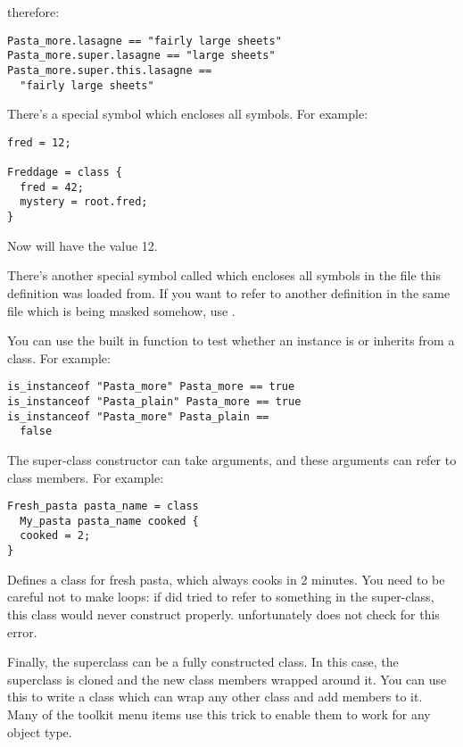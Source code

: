 \noindent
therefore:

\begin{verbatim}
Pasta_more.lasagne == "fairly large sheets"
Pasta_more.super.lasagne == "large sheets"
Pasta_more.super.this.lasagne ==
  "fairly large sheets" 
\end{verbatim}

There's a special symbol  which encloses all symbols. For
example:

\begin{verbatim}
fred = 12; 

Freddage = class { 
  fred = 42;
  mystery = root.fred;
}
\end{verbatim}

\noindent
Now  will have the value 12.

There's another special symbol called  which encloses all symbols in
the file this definition was loaded from. If you want to refer to another
definition in the same file which is being masked somehow, use .

You can use the built in function  to test whether an
instance is or inherits from a class. For example:

\begin{verbatim}
is_instanceof "Pasta_more" Pasta_more == true
is_instanceof "Pasta_plain" Pasta_more == true
is_instanceof "Pasta_more" Pasta_plain ==
  false
\end{verbatim}

The super-class constructor can take arguments, and these arguments can refer
to class members. For example:

\begin{verbatim}
Fresh_pasta pasta_name = class
  My_pasta pasta_name cooked {
  cooked = 2;
}
\end{verbatim}

\noindent
Defines a class for fresh pasta, which always cooks in 2 minutes. You need to
be careful not to make loops: if  did tried to refer to
something in the super-class, this class would never construct properly.
\nip{} unfortunately does not check for this error.

Finally, the superclass can be a fully constructed class. In this case, the
superclass is cloned and the new class members wrapped around it. You can use
this to write a class which can wrap any other class and add members to it.
Many of the toolkit menu items use this trick to enable them to work for any
object type.

